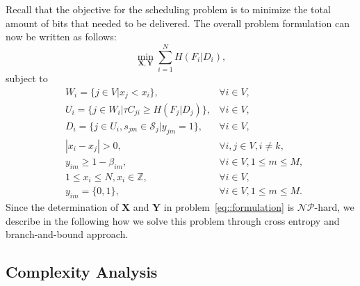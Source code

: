 Recall that the objective for the scheduling problem is to minimize the total amount of bits that needed to be delivered.
The overall problem formulation can now be written as follows:
\begin{equation*}
\underset{\mathbf{X}, \mathbf{Y}}{\min} \sum_{i=1}^{N} H(F_i|D_i),
\end{equation*}
subject to
\begin{align}
&W_i = \{ j \in V | x_j < x_i \}, &\forall i \in V, \nonumber \\
&U_i = \{ j \in W_i | \tau C_{ji} \geq H(F_j|D_j) \}, &\forall i \in V, \nonumber \\
&D_i = \{ j \in U_i, s_{jm} \in \mathcal{S}_j | y_{jm} = 1 \}, &\forall i \in V, \nonumber \\
&|x_i - x_j| > 0, &\forall i,j \in V, i \neq k, \nonumber \\
&y_{im} \geq 1-\beta_{im}, &\forall i \in V, 1 \leq m \leq M, \nonumber \\
&1 \leq x_i \leq N, x_i \in \mathbb{Z}, &\forall i \in V, \nonumber \\
&y_{im} = \{0,1\}, &\forall i \in V, 1 \leq m \leq M.
\label{eq::formulation}
\end{align}
Since the determination of $\mathbf{X}$ and $\mathbf{Y}$ in problem~\eqref{eq::formulation} is $\mathcal{NP}$-hard, we describe in the following how we solve this problem through cross entropy and branch-and-bound approach.
%
\subsection{Complexity Analysis}